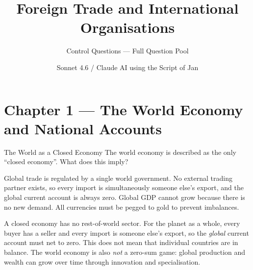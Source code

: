 \documentclass[paper=a5]{scrartcl}
\title{Foreign Trade and International Organisations}
\subtitle{Control Questions — Full Question Pool}
\author{Sonnet 4.6 / Claude AI using the Script of Jan \noun{Suchanek}}
\begin{document}
\setcounter{page}{247}
\onehalfspacing

\maketitle

\clearpage



\section{Chapter 1 — The World Economy and National Accounts}

\begin{question}[type=mc]{The World as a Closed Economy}
The world economy is described as the only ``closed economy''. What does
this imply?
\begin{choices}
  \choice        Global trade is regulated by a single world government.
  \correctchoice No external trading partner exists, so every import is
                 simultaneously someone else's export, and the global current
                 account is always zero.
  \choice        Global GDP cannot grow because there is no new demand.
  \choice        All currencies must be pegged to gold to prevent imbalances.
\end{choices}
\begin{solution}
  A closed economy has no rest-of-world sector. For the planet as a whole,
  every buyer has a seller and every import is someone else's export, so the
  \emph{global} current account must net to zero. This does not mean that
  individual countries are in balance. The world economy is also \emph{not}
  a zero-sum game: global production and wealth can grow over time through
  innovation and specialisation.
\end{solution}
\end{question}
\end{document}
